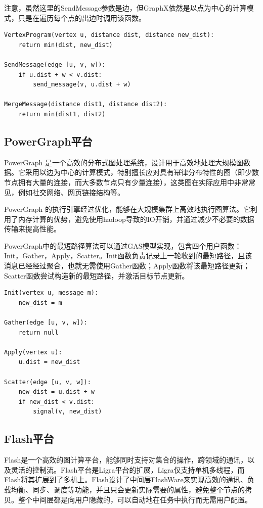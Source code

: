 注意，虽然这里的SendMessage参数是边，但GraphX依然是以点为中心的计算模式，只是在遍历每个点的出边时调用该函数。

\begin{lstlisting}
VertexProgram(vertex u, distance dist, distance new_dist):
    return min(dist, new_dist)

SendMessage(edge [u, v, w]):
    if u.dist + w < v.dist:
        send_message(v, u.dist + w)

MergeMessage(distance dist1, distance dist2):
    return min(dist1, dist2)
\end{lstlisting}

\subsection{PowerGraph平台}

PowerGraph 是一个高效的分布式图处理系统，设计用于高效地处理大规模图数据。它采用以边为中心的计算模式，特别擅长应对具有幂律分布特性的图（即少数节点拥有大量的连接，而大多数节点只有少量连接），这类图在实际应用中非常常见，例如社交网络、网页链接结构等。

PowerGraph 的执行引擎经过优化，能够在大规模集群上高效地执行图算法。它利用了内存计算的优势，避免使用hadoop导致的IO开销，并通过减少不必要的数据传输来提高性能。

PowerGraph中的最短路径算法可以通过GAS模型实现，包含四个用户函数：Init，Gather，Apply，Scatter。Init函数负责记录上一轮收到的最短路径，且该消息已经经过聚合，也就无需使用Gather函数；Apply函数将该最短路径更新；Scatter函数尝试构造新的最短路径，并激活目标节点更新。
\begin{lstlisting}
Init(vertex u, message m):
    new_dist = m

Gather(edge [u, v, w]):
    return null

Apply(vertex u):
    u.dist = new_dist

Scatter(edge [u, v, w]):
    new_dist = u.dist + w
    if new_dist < v.dist:
        signal(v, new_dist)
\end{lstlisting}






\subsection{Flash平台}

Flash是一个高效的图计算平台，能够同时支持对集合的操作，跨领域的通讯，以及灵活的控制流。Flash平台是Ligra平台的扩展，Ligra仅支持单机多线程，而Flash将其扩展到了多机上。Flash设计了中间层FlashWare来实现高效的通讯、负载均衡、同步、调度等功能，并且只会更新实际需要的属性，避免整个节点的拷贝。整个中间层都是向用户隐藏的，可以自动地在任务中执行而无需用户配置。

